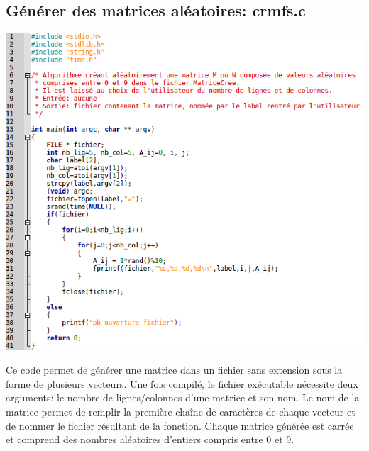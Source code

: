 \documentclass[a4paper, 11pt]{article}
\begin{document}
	\subsection{Générer des matrices aléatoires: crmfs.c}
    \vspace{2\baselineskip}
    \label{crmfs.c}
  	\begin{center}
        \includegraphics[scale=0.6, angle=0]{./img/crmfs.png}
    \end{center}
    \vspace{2\baselineskip}
    Ce code permet de générer une matrice dans un fichier sans extension sous la forme de plusieurs vecteurs. Une fois compilé, le fichier exécutable nécessite deux arguments: le nombre de lignes/colonnes d'une matrice et son nom. Le nom de la matrice permet de remplir la première chaîne de caractères de chaque vecteur et de nommer le fichier résultant de la fonction. Chaque matrice générée est carrée et comprend des nombres aléatoires d'entiers compris entre 0 et 9.
\clearpage

	
\end{document}
